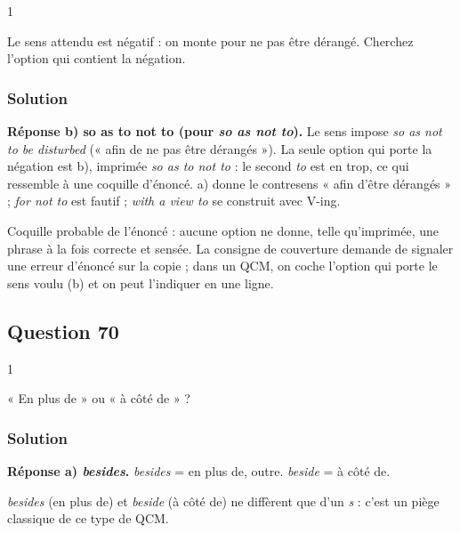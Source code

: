 \documentclass[11pt,a4paper]{article}
\begin{document}
\begin{indication}{1}

Le sens attendu est négatif : on monte pour ne pas être dérangé. Cherchez l'option qui contient la négation.

\end{indication}

\hypertarget{solution-68}{%
\subsubsection{Solution}\label{solution-68}}

\textbf{Réponse b) so as to not to (pour \emph{so as not to}).} Le sens impose \emph{so as not to be disturbed} (« afin de ne pas être dérangés »). La seule option qui porte la négation est b), imprimée \emph{so as to not to} : le second \emph{to} est en trop, ce qui ressemble à une coquille d'énoncé. a) donne le contresens « afin d'être dérangés » ; \emph{for not to} est fautif ; \emph{with a view to} se construit avec V-ing.

\begin{piege}

Coquille probable de l'énoncé : aucune option ne donne, telle qu'imprimée, une phrase à la fois correcte et sensée. La consigne de couverture demande de signaler une erreur d'énoncé sur la copie ; dans un QCM, on coche l'option qui porte le sens voulu (b) et on peut l'indiquer en une ligne.

\end{piege}

\hypertarget{question-70}{%
\subsection{Question 70}\label{question-70}}

\begin{indication}{1}

« En plus de » ou « à côté de » ?

\end{indication}

\hypertarget{solution-69}{%
\subsubsection{Solution}\label{solution-69}}

\textbf{Réponse a) \emph{besides}.} \emph{besides} = en plus de, outre. \emph{beside} = à côté de.

\begin{piege}

\emph{besides} (en plus de) et \emph{beside} (à côté de) ne diffèrent que d'un \emph{s} : c'est un piège classique de ce type de QCM.

\end{piege}
\end{document}
